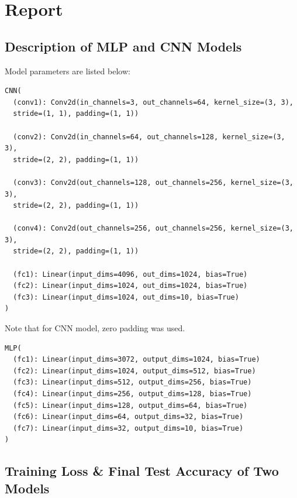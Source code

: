 \documentclass[12pt,letterpaper]{article}
\begin{document}
{}

\section*{Report}

\subsection*{Description of MLP and CNN Models}
Model parameters are listed below: 
\begin{verbatim}
CNN(
  (conv1): Conv2d(in_channels=3, out_channels=64, kernel_size=(3, 3), 
  stride=(1, 1), padding=(1, 1))
  
  (conv2): Conv2d(in_channels=64, out_channels=128, kernel_size=(3, 3), 
  stride=(2, 2), padding=(1, 1))
  
  (conv3): Conv2d(out_channels=128, out_channels=256, kernel_size=(3, 3), 
  stride=(2, 2), padding=(1, 1))
  
  (conv4): Conv2d(out_channels=256, out_channels=256, kernel_size=(3, 3), 
  stride=(2, 2), padding=(1, 1))
  
  (fc1): Linear(input_dims=4096, out_dims=1024, bias=True)
  (fc2): Linear(input_dims=1024, out_dims=1024, bias=True)
  (fc3): Linear(input_dims=1024, out_dims=10, bias=True)
)
\end{verbatim}
Note that for CNN model, zero padding was used.

\begin{verbatim}
MLP(
  (fc1): Linear(input_dims=3072, output_dims=1024, bias=True)
  (fc2): Linear(input_dims=1024, output_dims=512, bias=True)
  (fc3): Linear(input_dims=512, output_dims=256, bias=True)
  (fc4): Linear(input_dims=256, output_dims=128, bias=True)
  (fc5): Linear(input_dims=128, output_dims=64, bias=True)
  (fc6): Linear(input_dims=64, output_dims=32, bias=True)
  (fc7): Linear(input_dims=32, output_dims=10, bias=True)
)
\end{verbatim}


\subsection*{Training Loss \& Final Test Accuracy of Two Models}
\end{document}
